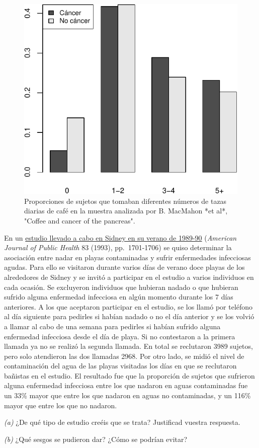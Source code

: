 \documentclass[
]{book}
\theoremstyle{definition}
\theoremstyle{definition}
\theoremstyle{definition}
\theoremstyle{definition}
\theoremstyle{remark}
\begin{document}
\begin{figure}

{\centering \includegraphics[width=0.5\linewidth]{INREMDN_files/figure-latex/macmahon-1} 

}

\caption{Proporciones de sujetos que tomaban diferentes números de tazas diarias de café en la muestra analizada por B. MacMahon *et al*, "Coffee and cancer of the pancreas".}\label{fig:macmahon}
\end{figure}

\begin{rmdexercici}
En un \href{https://ajph.aphapublications.org/doi/abs/10.2105/AJPH.83.12.1701}{estudio llevado a cabo en Sidney en su verano de 1989-90} (\emph{American Journal of Public Health} 83 (1993), pp.~1701-1706) se quiso determinar la asociación entre nadar en playas contaminadas y sufrir enfermedades infecciosas agudas. Para ello se visitaron durante varios días de verano doce playas de los alrededores de Sidney y se invitó a participar en el estudio a varios individuos en cada ocasión. Se excluyeron individuos que hubieran nadado o que hubieran sufrido alguna enfermedad infecciosa en algún momento durante los 7 días anteriores. A los que aceptaron participar en el estudio, se los llamó por teléfono al día siguiente para pedirles si habían nadado o no el día anterior y se los volvió a llamar al cabo de una semana para pedirles si habían sufrido alguna enfermedad infecciosa desde el día de playa. Si no contestaron a la primera llamada ya no se realizó la segunda llamada. En total se reclutaron 3989 sujetos, pero solo atendieron las dos llamadas 2968. Por otro lado, se midió el nivel de contaminación del agua de las playas visitadas los días en que se reclutaron bañistas en el estudio. El resultado fue que la proporción de sujetos que sufrieron alguna enfermedad infecciosa
entre los que nadaron en aguas contaminadas fue un 33\% mayor que entre los que nadaron en aguas no contaminadas, y un 116\% mayor que entre los que no nadaron.

\emph{(a)} ¿De qué tipo de estudio creéis que se trata? Justificad vuestra respuesta.

\emph{(b)} ¿Qué sesgos se pudieron dar? ¿Cómo se podrían evitar?
\end{rmdexercici}
\end{document}
